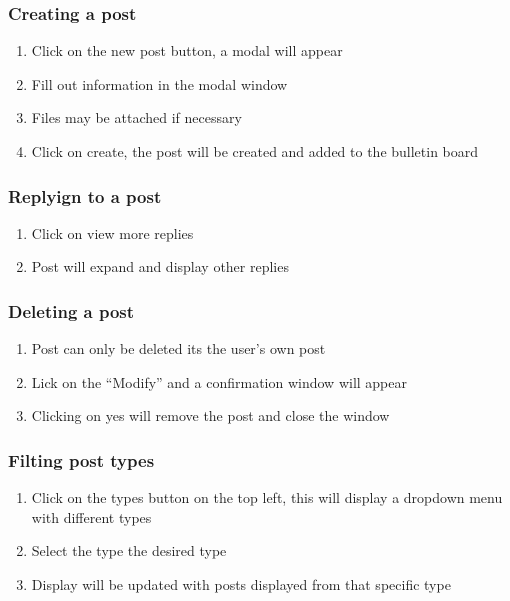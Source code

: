 \documentclass[12pt]{article}
\begin{document}
\subsubsection{Creating a post}
\begin{enumerate}
\item Click on the new post button, a modal will appear
\item Fill out information in the modal window
\item Files may be attached if necessary
\item Click on create, the post will be created and added to the bulletin board
\end{enumerate}

\subsubsection{Replyign to a post}
\begin{enumerate}
\item Click on view more replies
\item Post will expand and display other replies
\end{enumerate}

\subsubsection{Deleting a post}
\begin{enumerate}
\item Post can only be deleted its the user's own post
\item Lick on the ``Modify'' and a confirmation window will appear
\item Clicking on yes will remove the post and close the window
\end{enumerate}

\subsubsection{Filting post types}
\begin{enumerate}
\item Click on the types button on the top left, this will display a dropdown menu with different types
\item Select the type the desired type
\item Display will be updated with posts displayed from that specific type
\end{enumerate}
\end{document}
